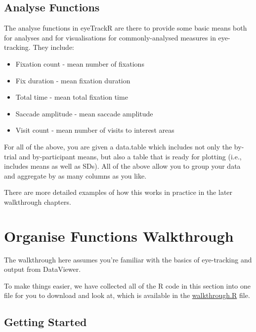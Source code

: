 \documentclass[]{book}
\providecommand{\tightlist}{%
  \setlength{\itemsep}{0pt}\setlength{\parskip}{0pt}}
\begin{document}
\hypertarget{analyse-functions}{%
\section{Analyse Functions}\label{analyse-functions}}

The analyse functions in eyeTrackR are there to provide some basic means both for analyses and for visualisations for commonly-analysed measures in eye-tracking. They include:

\begin{itemize}
\tightlist
\item
  Fixation count - mean number of fixations
\item
  Fix duration - mean fixation duration
\item
  Total time - mean total fixation time
\item
  Saccade amplitude - mean saccade amplitude
\item
  Visit count - mean number of visits to interest areas
\end{itemize}

For all of the above, you are given a data.table which includes not only the by-trial and by-participant means, but also a table that is ready for plotting (i.e., includes means as well as SDs). All of the above allow you to group your data and aggregate by as many columns as you like.

There are more detailed examples of how this works in practice in the later walkthrough chapters.

\hypertarget{organiseWakthrough}{%
\chapter{Organise Functions Walkthrough}\label{organiseWakthrough}}

The walkthrough here assumes you're familiar with the basics of eye-tracking and output from DataViewer.

To make things easier, we have collected all of the R code in this section into one file for you to download and look at, which is available in the \href{https://github.com/hjgodwin/eyeTrackR/blob/master/Walkthroughs/walkthrough.R}{walkthrough.R} file.

\hypertarget{getting-started}{%
\section{Getting Started}\label{getting-started}}
\end{document}
